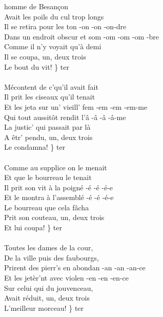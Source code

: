
 homme de Besançon \bissimple
\\Avait les poils du cul trop longs \bissimple
\\Il se retira pour les ton -on -on -on-dre
\\Dans un endroit obscur et som -om -om -om -bre
\\Comme il n'y voyait qu'à demi \bissimple
\\Il se coupa, un, deux trois
\\Le bout du vit! \} ter
\\\\Mécontent de c'qu'il avait fait \bissimple
\\Il prit les ciseaux qu'il tenait \bissimple
\\Et les jeta sur un' vieill' fem -em -em -em-me
\\Qui tout aussitôt rendit l'â -â -â -â-me
\\La justic' qui passait par là \bissimple
\\A êtr' pendu, un, deux trois
\\Le condamna! \} ter
\\\\Comme au supplice on le menait \bissimple
\\Et que le bourreau le tenait \bissimple
\\Il prit son vit à la poigné -é -é -é-e
\\Et le montra à l'assemblé -é -é -é-e
\\Le bourreau que cela fâcha \bissimple
\\Prit son couteau, un, deux trois
\\Et lui coupa! \} ter
\\\\Toutes les dames de la cour, \bissimple
\\De la ville puis des faubourgs, \bissimple
\\Prirent des pierr's en abondan -an -an -an-ce
\\Et les jetèr'nt avec violen -en -en -en-ce
\\Sur celui qui du jouvenceau, \bissimple
\\Avait réduit, un, deux trois
\\L'meilleur morceau! \} ter

